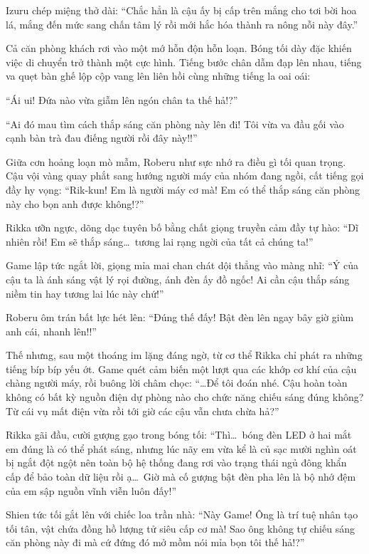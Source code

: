 \documentclass[../main.tex]{subfiles}
\begin{document}
Izuru chép miệng thở dài: ``Chắc hẳn là cậu ấy bị cấp trên mắng cho tơi bời hoa lá, mắng đến mức sang chấn tâm lý rồi mới hắc hóa thành ra nông nỗi này đây.''

Cả căn phòng khách rơi vào một mớ hỗn độn hỗn loạn. Bóng tối dày đặc khiến việc di chuyển trở thành một cực hình. Tiếng bước chân dẫm đạp lên nhau, tiếng va quẹt bàn ghế lộp cộp vang lên liên hồi cùng những tiếng la oai oái:

``Ái ui! Đứa nào vừa giẫm lên ngón chân ta thế hả!?''

``Ai đó mau tìm cách thắp sáng căn phòng này lên đi! Tôi vừa va đầu gối vào cạnh bàn trà đau điếng người rồi đây này!!''

Giữa cơn hoảng loạn mò mẫm, Roberu như sực nhớ ra điều gì tối quan trọng. Cậu vội vàng quay phắt sang hướng người máy của nhóm đang ngồi, cất tiếng gọi đầy hy vọng: ``Rik-kun! Em là người máy cơ mà! Em có thể thắp sáng căn phòng này cho bọn anh được không!?''

Rikka ưỡn ngực, dõng dạc tuyên bố bằng chất giọng truyền cảm đầy tự hào: ``Dĩ nhiên rồi! Em sẽ thắp sáng\dots\ tương lai rạng ngời của tất cả chúng ta!''

Game lập tức ngắt lời, giọng mỉa mai chan chát dội thẳng vào màng nhĩ: ``Ý của cậu ta là ánh sáng vật lý rọi đường, ánh đèn ấy đồ ngốc! Ai cần cậu thắp sáng niềm tin hay tương lai lúc này chứ!''

Roberu ôm trán bất lực hét lên: ``Đúng thế đấy! Bật đèn lên ngay bây giờ giùm anh cái, nhanh lên!!''

Thế nhưng, sau một thoáng im lặng đáng ngờ, từ cơ thể Rikka chỉ phát ra những tiếng bíp bíp yếu ớt. Game quét cảm biến một lượt qua các khớp cơ khí của cậu chàng người máy, rồi buông lời châm chọc: ``\dots Để tôi đoán nhé. Cậu hoàn toàn không có bất kỳ nguồn điện dự phòng nào cho chức năng chiếu sáng đúng không? Từ cái vụ mất điện vừa rồi tới giờ các cậu vẫn chưa chừa hả?''

Rikka gãi đầu, cười gượng gạo trong bóng tối: ``Thì\dots\ bóng đèn LED ở hai mắt em đúng là có thể phát sáng, nhưng lúc nãy em vừa kể là củ sạc mười nghìn oát bị ngắt đột ngột nên toàn bộ hệ thống đang rơi vào trạng thái ngủ đông khẩn cấp để bảo toàn dữ liệu rồi ạ\dots\ Giờ mà cố gượng bật đèn pha lên là bộ nhớ đệm của em sập nguồn vĩnh viễn luôn đấy!''

Shien tức tối gắt lên với chiếc loa trần nhà: ``Này Game! Ông là trí tuệ nhân tạo tối tân, vật chứa đồng hồ lượng tử siêu cấp cơ mà! Sao ông không tự chiếu sáng căn phòng này đi mà cứ đứng đó mở mồm nói mỉa bọn tôi thế hả!?''
\end{document}
